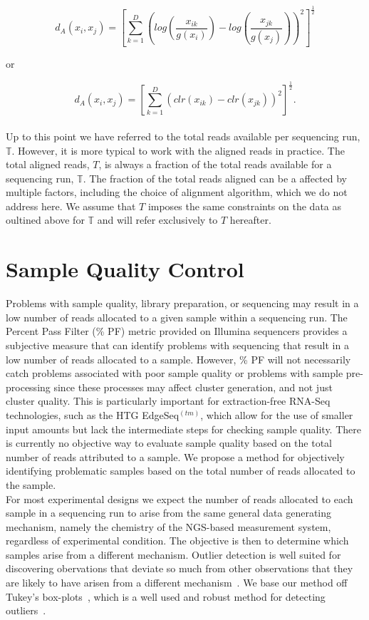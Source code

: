 \documentclass{article}\usepackage[]{graphicx}\usepackage[]{color}
\theoremstyle{definition}
\begin{document}
$$d_A(x_i, x_j) = \left[\sum_{k=1}^D \left( log \left(\frac{x_{ik}}{g(x_i)} \right) - log \left(\frac{x_{jk}}{g(x_j)} \right) \right)^2  \right]^\frac{1}{2}$$

or

 $$d_A(x_i, x_j) = \left[\sum_{k=1}^D \left( clr(x_{ik}) - clr(x_{jk}) \right)^2  \right]^\frac{1}{2}.$$
\\

Up to this point we have referred to the total reads available per sequencing run, $\mathbb{T}$.  However, it is more typical to work with the aligned reads in practice.  The total aligned reads, $T$, is always a fraction of the total reads available for a sequencing run, $\mathbb{T}$.  The fraction of the total reads aligned can be a affected by multiple factors, including the choice of alignment algorithm, which we do not address here.  We assume that $T$ imposes the same constraints on the data as oultined above for $\mathbb{T}$ and will refer exclusively to $T$ hereafter.\\  



\section{Sample Quality Control}
Problems with sample quality, library preparation, or sequencing may result in a low number of reads allocated to a given sample within a sequencing run.  The Percent Pass Filter (\% PF) metric provided on Illumina sequencers provides a subjective measure that can identify problems with sequencing that result in a low number of reads allocated to a sample.  However, \% PF will not necessarily catch problems associated with poor sample quality or problems with sample pre-processing since these processes may affect cluster generation, and not just cluster quality.  This is particularly important for extraction-free RNA-Seq technologies, such as the HTG EdgeSeq$^{(tm)}$, which allow for the use of smaller input amounts but lack the intermediate steps for checking sample quality.  There is currently no objective way to evaluate sample quality based on the total number of reads attributed to a sample. We propose a method for objectively identifying problematic samples based on the total number of reads allocated to the sample. \\

For most experimental designs we expect the number of reads allocated to each sample in a sequencing run to arise from the same general data generating mechanism, namely the chemistry of the NGS-based measurement system, regardless of experimental condition.  The objective is then to determine which samples arise from a different mechanism.  Outlier detection is well suited for discovering obervations that deviate so much from other observations that they are likely to have arisen from a different mechanism~\cite{Hawkins1980}.  We base our method off Tukey's box-plots~\cite{Tukey1977}, which is a well used and robust method for detecting outliers~\cite{Ben-Gal2009}.\\
\end{document}

